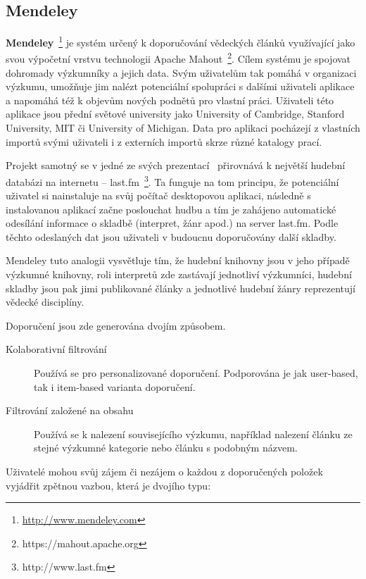 \documentclass[thesis=M,czech]{FITthesis}[2014/05/07]
\begin{document}
\subsection{Mendeley}	

\textbf{Mendeley}~\footnote{\url{http://www.mendeley.com}} je systém určený k doporučování vědeckých článků využívající jako svou výpočetní vrstvu technologii Apache Mahout~\footnote{https://mahout.apache.org}. Cílem systému je spojovat dohromady výzkumníky a jejich data. Svým uživatelům tak pomáhá v organizaci výzkumu, umožňuje jim nalézt potenciální spolupráci s dalšími uživateli aplikace a napomáhá též k objevům nových podnětů pro vlastní práci. Uživateli této aplikace jsou přední světové university jako University of Cambridge, Stanford University, MIT či University of Michigan. Data pro aplikaci pocházejí z vlastních importů svými uživateli i z externích importů skrze různé katalogy prací. 

Projekt samotný se v jedné ze svých prezentací~\cite{mendeleylastfm} přirovnává k největší hudební databázi na internetu – last.fm~\footnote{http://www.last.fm}. Ta funguje na tom principu, že potenciální uživatel si nainstaluje na svůj počítač desktopovou aplikaci, následně s instalovanou aplikací začne poslouchat hudbu a tím je zahájeno automatické odesílání informace o skladbě (interpret, žánr apod.) na server last.fm. Podle těchto odeslaných dat jsou uživateli v budoucnu doporučovány další skladby. 

Mendeley tuto analogii vysvětluje tím, že hudební knihovny jsou v jeho případě výzkumné knihovny, roli interpretů zde zastávají jednotliví výzkumníci, hudební skladby jsou pak jimi publikované články a jednotlivé hudební žánry reprezentují vědecké disciplíny.  

Doporučení jsou zde generována dvojím způsobem. 

\begin{description}
	\item[Kolaborativní filtrování] Používá se pro personalizované doporučení. Podporována je jak user-based, tak i item-based varianta doporučení.
	\item[Filtrování založené na obsahu] Používá se k nalezení souvisejícího výzkumu, například nalezení článku ze stejné výzkumné kategorie nebo článku s podobným názvem. 
\end{description}

Uživatelé mohou svůj zájem či nezájem o každou z doporučených položek vyjádřit zpětnou vazbou, která je dvojího typu:
\end{document}
